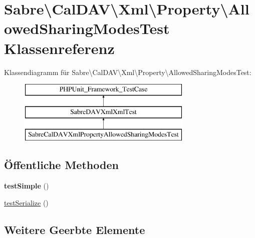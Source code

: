 \hypertarget{class_sabre_1_1_cal_d_a_v_1_1_xml_1_1_property_1_1_allowed_sharing_modes_test}{}\section{Sabre\textbackslash{}Cal\+D\+AV\textbackslash{}Xml\textbackslash{}Property\textbackslash{}Allowed\+Sharing\+Modes\+Test Klassenreferenz}
\label{class_sabre_1_1_cal_d_a_v_1_1_xml_1_1_property_1_1_allowed_sharing_modes_test}
Klassendiagramm für Sabre\textbackslash{}Cal\+D\+AV\textbackslash{}Xml\textbackslash{}Property\textbackslash{}Allowed\+Sharing\+Modes\+Test\+:\begin{figure}[H]
\begin{center}
\leavevmode
\includegraphics[height=3.000000cm]{class_sabre_1_1_cal_d_a_v_1_1_xml_1_1_property_1_1_allowed_sharing_modes_test}
\end{center}
\end{figure}
\subsection*{Öffentliche Methoden}
\begin{DoxyCompactItemize}
\item 
\mbox{\label{class_sabre_1_1_cal_d_a_v_1_1_xml_1_1_property_1_1_allowed_sharing_modes_test_a8475557d5190163356f9003a26805ebd}} 
{\bfseries test\+Simple} ()
\item 
\mbox{\hyperlink{class_sabre_1_1_cal_d_a_v_1_1_xml_1_1_property_1_1_allowed_sharing_modes_test_aa479c0198532492ecb45b13a6ba97ef5}{test\+Serialize}} ()
\end{DoxyCompactItemize}
\subsection*{Weitere Geerbte Elemente}


